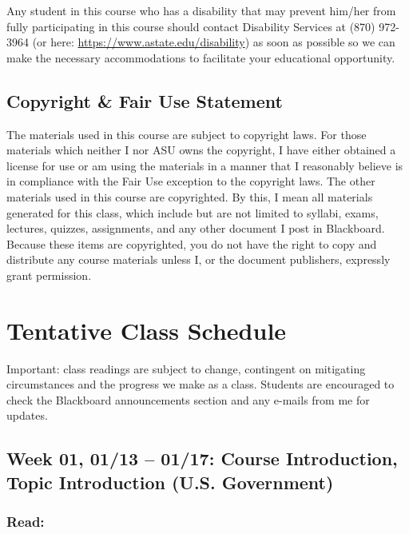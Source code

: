 \documentclass[11pt,]{article}
\begin{document}
Any student in this course who has a disability that may prevent him/her
from fully participating in this course should contact Disability
Services at (870) 972-3964 (or here:
\url{https://www.astate.edu/disability}) as soon as possible so we can
make the necessary accommodations to facilitate your educational
opportunity.

\hypertarget{copyright-fair-use-statement}{%
\subsection{Copyright \& Fair Use
Statement}\label{copyright-fair-use-statement}}

The materials used in this course are subject to copyright laws. For
those materials which neither I nor ASU owns the copyright, I have
either obtained a license for use or am using the materials in a manner
that I reasonably believe is in compliance with the Fair Use exception
to the copyright laws. The other materials used in this course are
copyrighted. By this, I mean all materials generated for this class,
which include but are not limited to syllabi, exams, lectures, quizzes,
assignments, and any other document I post in Blackboard. Because these
items are copyrighted, you do not have the right to copy and distribute
any course materials unless I, or the document publishers, expressly
grant permission.

\newpage

\hypertarget{tentative-class-schedule}{%
\section{Tentative Class Schedule}\label{tentative-class-schedule}}

Important: class readings are subject to change, contingent on
mitigating circumstances and the progress we make as a class. Students
are encouraged to check the Blackboard announcements section and any
e-mails from me for updates.

\hypertarget{week-01-0113-0117-course-introduction-topic-introduction-u.s.-government}{%
\subsection{Week 01, 01/13 -- 01/17: Course Introduction, Topic
Introduction (U.S.
Government)}\label{week-01-0113-0117-course-introduction-topic-introduction-u.s.-government}}

\hypertarget{read}{%
\subsubsection{Read:}\label{read}}
\end{document}
